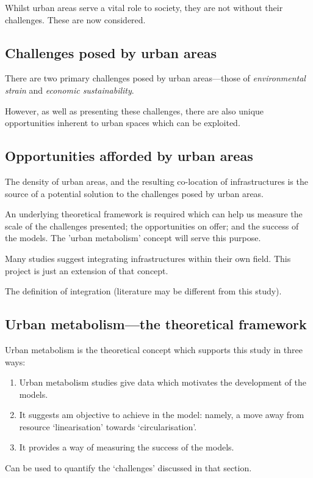 Whilst urban areas serve a vital role to society, they are not without their challenges. These are now considered. 

\subsection{Challenges posed by urban areas}
There are two primary challenges posed by urban areas---those of \emph{environmental strain} and \emph{economic sustainability}.

However, as well as presenting these challenges, there are also unique opportunities inherent to urban spaces which can be exploited.

\subsection{Opportunities afforded by urban areas}
The density of urban areas, and the resulting co-location of infrastructures is the source of a potential solution to the challenges posed by urban areas.

An underlying theoretical framework is required which can help us measure the scale of the challenges presented; the opportunities on offer; and the success of the models. The 'urban metabolism' concept will serve this purpose.

Many studies suggest integrating infrastructures within their own field. This project is just an extension of that concept.

The definition of integration (literature may be different from this study).


\subsection{Urban metabolism---the theoretical framework}
Urban metabolism is the theoretical concept which supports this study in three ways:
\begin{enumerate}
	\item Urban metabolism studies give data which motivates the development of the models.
	\item It suggests am objective to achieve in the model: namely, a move away from resource `linearisation' towards `circularisation'.
	\item It provides a way of measuring the success of the models.
\end{enumerate}
Can be used to quantify the `challenges' discussed in that section.

